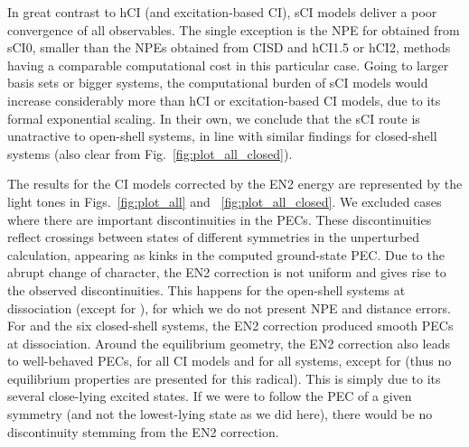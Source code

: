 \documentclass[aip,jcp,reprint,noshowkeys,superscriptaddress]{revtex4-1}
\newcommand{\SupInf}{\textcolor{blue}{Supporting Information}}
\begin{document}
In great contrast to hCI (and excitation-based CI),
sCI models deliver a poor convergence of all observables.
The single exception is the NPE for  obtained from sCI0, smaller than the NPEs obtained from CISD and hCI1.5 or hCI2, methods having a comparable computational cost in this particular case.
Going to larger basis sets or bigger systems, the computational burden of sCI models would increase considerably more than hCI or excitation-based CI models, 
due to its formal exponential scaling.
In their own, we conclude that the sCI route is unatractive to open-shell systems,
in line with similar findings for closed-shell systems \cite{Kossoski_2022} (also clear from Fig.~\ref{fig:plot_all_closed}).


The results for the CI models corrected by the EN2 energy are represented by the light tones in Figs.~\ref{fig:plot_all} and ~\ref{fig:plot_all_closed}.
We excluded cases where there are important discontinuities in the PECs.
These discontinuities reflect crossings between states of different symmetries in the unperturbed calculation,
appearing as kinks in the computed ground-state PEC.
Due to the abrupt change of character, the EN2 correction is not uniform and gives rise to the observed discontinuities.
This happens for the open-shell systems at dissociation (except for ), for which we do not present NPE and distance errors.
For  and the six closed-shell systems, the EN2 correction produced smooth PECs at dissociation.
Around the equilibrium geometry, the EN2 correction also leads to well-behaved PECs, for all CI models and for all systems, except for 
(thus no equilibrium properties are presented for this radical).
This is simply due to its several close-lying excited states. \cite{}
If we were to follow the PEC of a given symmetry (and not the lowest-lying state as we did here), there would be no discontinuity stemming from the EN2 correction.
\end{document}
